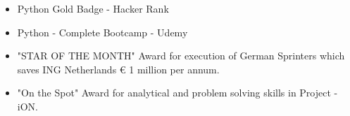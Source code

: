 \documentclass[10pt,a4paper,ragged2e,withhyper]{altacv}
\begin{document}
\begin{paracol}{2}
\label{sec:orgd117464}
\begin{itemize}
\item Python Gold Badge - Hacker Rank
\item Python - Complete Bootcamp - Udemy
\end{itemize}

\label{sec:orgd117464}
\begin{itemize}
\item "STAR OF THE MONTH" Award for execution of German Sprinters which saves ING Netherlands € 1 million per annum.
\item "On the Spot" Award for analytical and problem solving skills in Project - iON.
\end{itemize}
\end{paracol}
\end{document}
